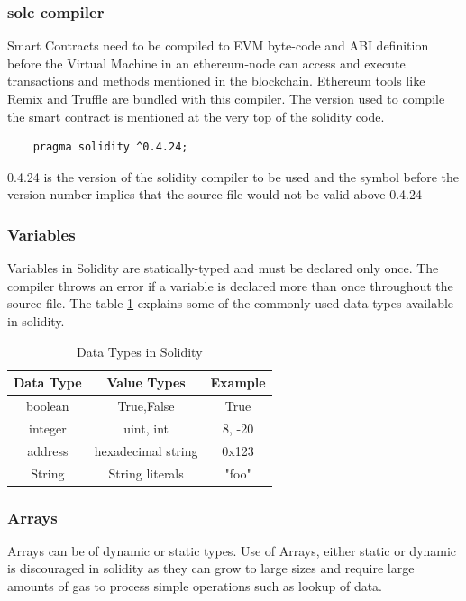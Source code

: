 \documentclass[11pt,openright]{report}
\begin{document}
\subsubsection{solc compiler}
Smart Contracts need to be compiled to EVM byte-code and ABI definition before the Virtual Machine in an ethereum-node can access and execute transactions and methods mentioned in the blockchain. Ethereum tools like Remix and Truffle are bundled with this compiler. The version used to compile the smart contract is mentioned at the very top of the solidity code.

\begin{verbatim}
    pragma solidity ^0.4.24;
\end{verbatim}

0.4.24 is the version of the solidity compiler to be used and the symbol before the version number implies that the source file would not be valid above 0.4.24

\subsubsection{Variables}
Variables in Solidity are statically-typed and must be declared only once. The compiler throws an error if a variable is declared more than once throughout the source file. The table \ref{solidity_data_types} explains some of the commonly used data types available in solidity.
 
\begin{table}[!htbp]
	\renewcommand{\arraystretch}{1.3}
	\caption{Data Types in Solidity}
	\label{solidity_data_types}
	\centering
	\begin{tabular}{|c|c|c|}
		\hline
		\bfseries Data Type & \bfseries Value Types & \bfseries Example \\
		\hline\hline
		boolean & True,False & True \\ \hline
		integer & uint, int & 8, -20 \\ \hline
		address & hexadecimal string & 0x123 \\ \hline
		String & String literals & "foo" \\ \hline
	\end{tabular}
\end{table}

\newpage
\subsubsection{Arrays}
Arrays can be of dynamic or static types. Use of Arrays, either static or dynamic is discouraged in solidity as they can grow to large sizes and require large amounts of gas to process simple operations such as lookup of data.
\end{document}

